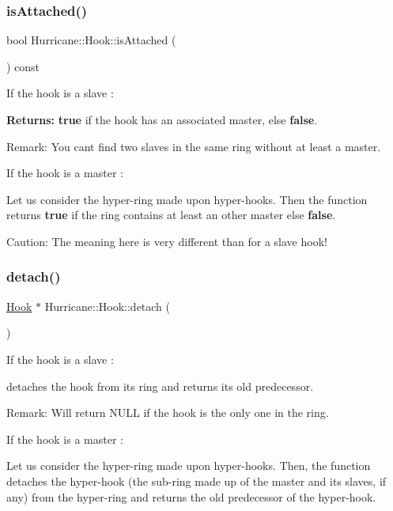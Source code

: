 \subsubsection{\texorpdfstring{is\+Attached()}{isAttached()}}
{\footnotesize\ttfamily bool Hurricane\+::\+Hook\+::is\+Attached (\begin{DoxyParamCaption}{ }\end{DoxyParamCaption}) const}

If the hook is a slave \+:

{\bfseries Returns\+:} {\bfseries true} if the hook has an associated master, else {\bfseries false}.

\begin{DoxyParagraph}{Remark\+:}
You can\textquotesingle{}t find two slaves in the same ring without at least a master.
\end{DoxyParagraph}
If the hook is a master \+:

Let us consider the hyper-\/ring made upon hyper-\/hooks. Then the function returns {\bfseries true} if the ring contains at least an other master else {\bfseries false}.

\begin{DoxyParagraph}{Caution\+:}
The meaning here is very different than for a slave hook! 
\end{DoxyParagraph}
\mbox{\label{classHurricane_1_1Hook_a83f5beb5092e97947d24bd18adb33db1}} 
\subsubsection{\texorpdfstring{detach()}{detach()}}
{\footnotesize\ttfamily \hyperlink{classHurricane_1_1Hook}{Hook} $\ast$ Hurricane\+::\+Hook\+::detach (\begin{DoxyParamCaption}{ }\end{DoxyParamCaption})}

If the hook is a slave \+:

detaches the hook from its ring and returns its old predecessor.

\begin{DoxyParagraph}{Remark\+:}
Will return N\+U\+LL if the hook is the only one in the ring.
\end{DoxyParagraph}
If the hook is a master \+:

Let us consider the hyper-\/ring made upon hyper-\/hooks. Then, the function detaches the hyper-\/hook (the sub-\/ring made up of the master and its slaves, if any) from the hyper-\/ring and returns the old predecessor of the hyper-\/hook.

